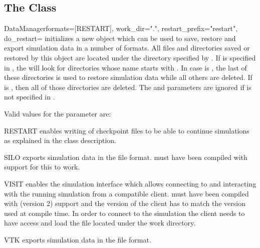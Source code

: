 \subsection{The  Class}
\label{sec:datamanager}

\begin{classdesc}{DataManager}{formats=[RESTART], work_dir=".", restart_prefix="restart", do_restart=\True}
    initializes a new  object which can be used to save,
    restore and export simulation data in a number of formats.
    All files and directories saved or restored by this object are located
    under the directory specified by .
    If  is specified in , the  will
    look for directories whose name starts with .
    In case  is \True, the last of these directories is used
    to restore simulation data while all others are deleted.
    If  is \False, then all of those directories are deleted.
    The  and  parameters are ignored if
     is not specified in .
\end{classdesc}

\noindent Valid values for the  parameter are:
\begin{memberdesc}[DataManager]{RESTART}
    enables writing of checkpoint files to be able to continue simulations
    as explained in the class description.
\end{memberdesc}
\begin{memberdesc}[DataManager]{SILO}
    exports simulation data in the \SILO file format. \escript must have
    been compiled with \SILO support for this to work.
\end{memberdesc}
\begin{memberdesc}[DataManager]{VISIT}
    enables the \VisIt simulation interface which allows connecting to and
    interacting with the running simulation from a compatible \VisIt client.
    \escript must have been compiled with \VisIt (version 2) support and the
    version of the client has to match the version used at compile time.
    In order to connect to the simulation the client needs to have access and
    load the file  located under the work directory.
\end{memberdesc}
\begin{memberdesc}[DataManager]{VTK}
    exports simulation data in the \VTK file format.
\end{memberdesc}

